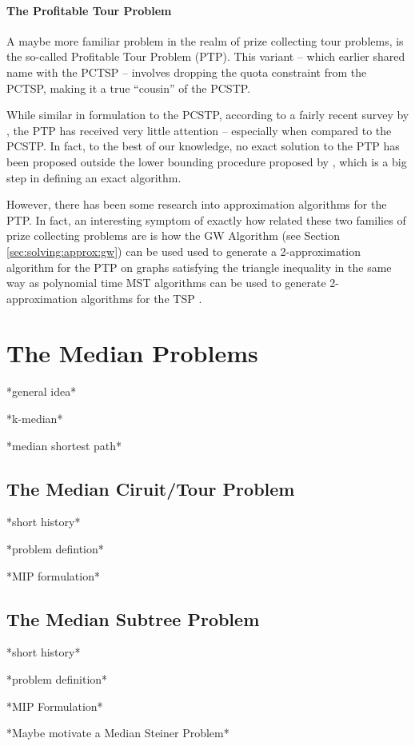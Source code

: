 \paragraph{The Profitable Tour Problem}
A maybe more familiar problem in the realm of prize collecting tour problems, is the
so-called Profitable Tour Problem (PTP). This variant -- which earlier shared name with
the PCTSP -- involves dropping the quota constraint from the PCTSP, making it a true
 ``cousin'' of the PCSTP.

 While similar in formulation to the PCSTP, according to a fairly recent survey by
 \citet{archetti2014chapter}, the PTP has received very little attention -- 
 especially when compared to the PCSTP.
 In fact, to the best of our knowledge, no exact solution to the PTP
 has been proposed outside the lower bounding procedure proposed by \citet{dell1995prize},
  which is a big step in defining an exact algorithm.
 
 However, there has been some research into approximation algorithms for the PTP.
 In fact, an interesting symptom of exactly how related these two families of
 prize collecting problems are
is how the GW Algorithm (see Section \ref{sec:solving:approx:gw})
can be used used to generate a 2-approximation algorithm for the PTP
on graphs satisfying the triangle inequality in the same way as
polynomial time MST algorithms can be used to generate 2-approximation algorithms
for the TSP \citep{goemans1995general}.



 \section{The Median  Problems}
 *general idea*
 
 *k-median*
 
 *median shortest path*
\subsection{The Median Ciruit/Tour Problem}
*short history*

*problem defintion*

*MIP formulation*
\subsection{The Median Subtree Problem}
*short history*

*problem definition*

*MIP Formulation*

*Maybe motivate a Median Steiner Problem*


